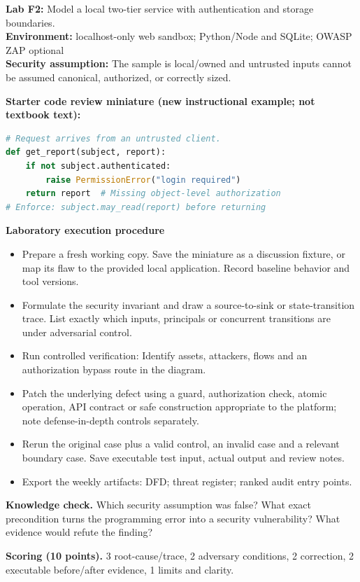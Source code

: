 \documentclass[10pt,letterpaper]{article}
\begin{document}
\begin{insight}\textbf{Lab F2:} Model a local two-tier service with authentication and storage boundaries.\\\textbf{Environment:} localhost-only web sandbox; Python/Node and SQLite; OWASP ZAP optional\\\textbf{Security assumption:} The sample is local/owned and untrusted inputs cannot be assumed canonical, authorized, or correctly sized.\end{insight}
\textbf{Starter code review miniature (new instructional example; not textbook text):}
\begin{lstlisting}[language=Python]
# Request arrives from an untrusted client.
def get_report(subject, report):
    if not subject.authenticated:
        raise PermissionError("login required")
    return report  # Missing object-level authorization
# Enforce: subject.may_read(report) before returning
\end{lstlisting}
\textbf{Laboratory execution procedure}
\begin{itemize}[leftmargin=*,itemsep=2pt]
\item Prepare a fresh working copy. Save the miniature as a discussion fixture, or map its flaw to the provided local application. Record baseline behavior and tool versions.
\item Formulate the security invariant and draw a source-to-sink or state-transition trace. List exactly which inputs, principals or concurrent transitions are under adversarial control.
\item Run controlled verification: Identify assets, attackers, flows and an authorization bypass route in the diagram.
\item Patch the underlying defect using a guard, authorization check, atomic operation, API contract or safe construction appropriate to the platform; note defense-in-depth controls separately.
\item Rerun the original case plus a valid control, an invalid case and a relevant boundary case. Save executable test input, actual output and review notes.
\item Export the weekly artifacts: DFD; threat register; ranked audit entry points.
\end{itemize}
\textbf{Knowledge check.} Which security assumption was false? What exact precondition turns the programming error into a security vulnerability? What evidence would refute the finding?

\textbf{Scoring (10 points).} 3 root-cause/trace, 2 adversary conditions, 2 correction, 2 executable before/after evidence, 1 limits and clarity.
\end{document}

